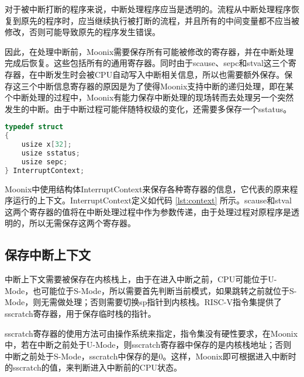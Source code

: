 对于被中断打断的程序来说，中断处理程序应当是透明的。流程从中断处理程序恢复到原先的程序时，应当继续执行被打断的流程，并且所有的中间变量都不应当被修改，否则可能导致原先的程序发生错误。

因此，在处理中断前，Moonix需要保存所有可能被修改的寄存器，并在中断处理完成后恢复。这些包括所有的通用寄存器。同时由于scause、sepc和stval这三个寄存器，在中断发生时会被CPU自动写入中断相关信息，所以也需要额外保存。保存这三个中断信息寄存器的原因是为了使得Moonix支持中断的递归处理，即在某个中断处理的过程中，Moonix有能力保存中断处理的现场转而去处理另一个突然发生的中断。由于中断过程可能伴随特权级的变化，还需要多保存一个sstatus。

\begin{minipage}[c]{0.95\textwidth}
\begin{lstlisting}[language={C}, caption={上下文结构定义}, label={lst:context}]
typedef struct
{
	usize x[32];
	usize sstatus;
	usize sepc;
} InterruptContext;
\end{lstlisting}
\end{minipage}

Moonix中使用结构体InterruptContext来保存各种寄存器的信息，它代表的原来程序运行的上下文。InterruptContext定义如代码 \ref{lst:context} 所示。scause和stval这两个寄存器的值将在中断处理过程中作为参数传递，由于处理过程对原程序是透明的，所以无需保存这两个寄存器。

\subsection{保存中断上下文}

中断上下文需要被保存在内核栈上，由于在进入中断之前，CPU可能位于U-Mode，也可能位于S-Mode，所以需要首先判断当前模式，如果跳转之前就位于S-Mode，则无需做处理；否则需要切换sp指针到内核栈。RISC-V指令集提供了sscratch寄存器，用于保存临时栈的指针。

sscratch寄存器的使用方法可由操作系统来指定，指令集没有硬性要求，在Moonix中，若在中断之前处于U-Mode，则sscratch寄存器中保存的是内核栈地址；否则中断之前处于S-Mode，sscratch中保存的是0。这样，Moonix即可根据进入中断时的sscratch的值，来判断进入中断前的CPU状态。


